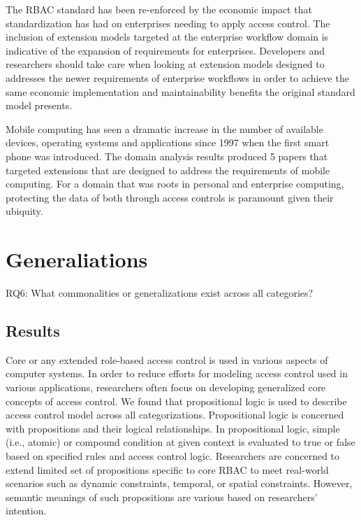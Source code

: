 The RBAC standard has been re-enforced by the economic impact that standardization has had on enterprises needing to apply access control.  The
inclusion of extension models targeted at the enterprise workflow domain is indicative of the expansion of requirements for enterprises. Developers
and researchers should take care when looking at extension models designed to addresses the newer requirements of enterprise workflows in order to
achieve the same economic implementation and maintainability benefits the original standard model presents.

Mobile computing has seen a dramatic increase in the number of available devices, operating systems and applications since 1997 when the first smart phone
was introduced. 
The domain analysis results produced 5 papers that targeted extensions that are designed to address the requirements of mobile computing.
For a domain that was roots in personal and enterprise computing, protecting the data of both through access controls is paramount given their ubiquity.


\section{Generaliations} \label{sec:generalizations}

RQ6: What commonalities or generalizations exist across all categories?

\subsection{Results}

Core or any extended role-based access control is used in various aspects of computer systems. In order to reduce efforts for modeling access control used in various applications, researchers often focus on developing generalized core concepts of access control.
We found that propositional logic is used to describe access control model across all categorizations. Propositional logic is concerned with propositions and their logical relationships. In propositional logic, simple (i.e., atomic) or compound condition at given context is evaluated to true or false based on specified rules and access control logic. Researchers are concerned to extend limited set of propositions specific to core RBAC to meet real-world scenarios such as dynamic constraints, temporal, or spatial constraints. However, semantic meanings of such propositions are various based on researchers' intention.

